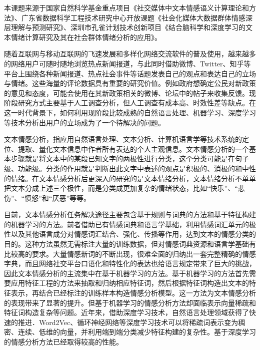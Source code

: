 


本课题来源于国家自然科学基金重点项目《社交媒体中文本情感语义计算理论和方法》、广东省数据科学工程技术研究中心开放课题《社会化媒体大数据群体情感深层理解与预测研究》、深圳市孔雀计划技术创新项目《结合脑科学和深度学习的文本情绪计算研究及其在社会群体情绪分析的应用》。



随着互联网与移动互联网的飞速发展和多样化网络交流软件的普及使用，越来越多的网络用户可随时随地浏览热点新闻报道，与此同时借助微博、Twitter、知乎等平台上围绕各种新闻报道、热点社会事件等话题发表自己的观点和表达自己的立场与情绪。这些海量的评论数据具有重要的研究价值。例如政府想确定公民对新政策的意见和态度，可能会使用在其新政策相关的微博、论坛中的帖子来收集反馈。现阶段研究方式主要基于人工调查分析，但人工调查有成本高、时效性差等缺点。在这一时代背景下，如何利用现阶段比较成熟的自然语言处理、机器学习、深度学习等技术分析出用户的立场成为了一个待解决的问题。

文本情感分析，指应用自然语言处理、文本分析、计算机语言学等技术系统的定位、提取、量化文本信息中作者所有表达的个人主观信息。文本情感分析的一个基本步骤就是将文本中的某段已知文字的两极性进行分类，这个分类可能是在句子级、功能级。分类的作用就是判断出此文字中表述的观点是积极的、消极的和中性的情绪。在文本情感分析后更深入的研究的是文本情绪分析，文本情绪分析不单单把文本分成上述三个极性，而是分类成更加复杂的情绪状态，比如“快乐”、“悲伤”、“愤怒”和“厌恶”等等。

目前，文本情感分析任务解决途径主要包含基于规则与词典的方法和基于特征构建的机器学习的方法。前者借助已有情感词典和语言学基础，利用情感词汇单元的极性以及其他语言成分对情感词汇结合、强化、传播等作用，达到文本的情感分类的目的。这种方法虽然无需标注大量的训练数据，但对情感词典资源和语言学基础有比较高的要求。大量情感新词的不断出现，很难全面的归纳出一套完整精确的情感字典，而且网络社交平台口语化和特性化的表达也给语言规定带来了巨大的挑战，因此文本情感分析的主流集中在基于机器学习的方法。基于机器学习的方法首先需要应用特征工程的方法来抽取和归纳相应特征词，然后根据特征词构造出文本的特征表示，再结合已经标注的训练样本构造情感分析模型。这一方法为文本情感分析的表现带来了显著的提升。但基于机器学习的情感分析方法却面临表示向量稀疏和特征词构造复杂等问题。近年来，借助深度学习技术，自然语言处理领域获得了快速的推进．Word2Vec、循环神经网络等深度学习技术可以将稀疏词表示变为稠密、连续、低维的向量，并利用端到端分类减少特征构建的复杂性。基于深度学习的情感分析方法已经取得较高的性能。

